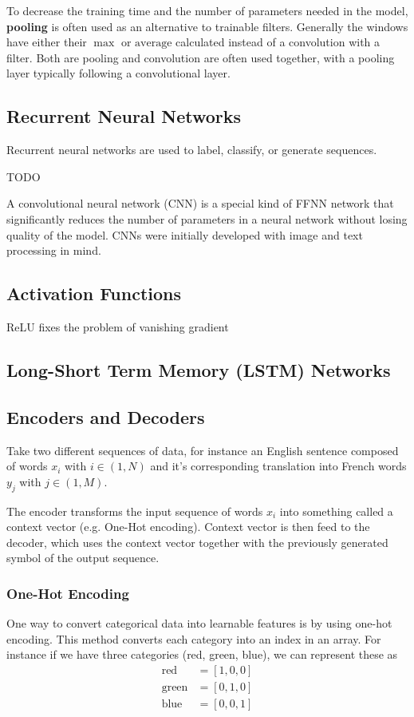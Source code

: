 To decrease the training time and the number of parameters needed in the model, \textbf{pooling} is often used as an alternative to trainable filters. Generally the windows have either their $\max$ or $\textrm{average}$ calculated instead of a convolution with a filter. Both are pooling and convolution are often used together, with a pooling layer typically following a convolutional layer.


\subsection{Recurrent Neural Networks}
Recurrent neural networks are used to label, classify, or generate sequences.

TODO



 A convolutional neural network (CNN) is a special kind of FFNN network that significantly reduces the number of parameters in a neural network without losing quality of the model. CNNs were initially developed with image and text processing in mind.


\subsection{Activation Functions}
ReLU fixes the problem of vanishing gradient




\subsection{Long-Short Term Memory (LSTM) Networks}

\subsection{Encoders and Decoders}
Take two different sequences of data, for instance an English sentence composed of words $x_i$ with $i\in (1,N)$ and it's corresponding translation into French words $y_j$ with $j\in(1,M)$.

The encoder transforms the input sequence of words $x_i$ into something called a context vector (e.g. One-Hot encoding). Context vector is then feed to the decoder, which uses the context vector together with the previously generated symbol of the output sequence. 

\subsubsection{One-Hot Encoding}
One way to convert categorical data into learnable features is by using one-hot encoding. This method converts each category into an index in an array. For instance if we have three categories (red, green, blue), we can represent these as
\begin{align}
    \textrm{red} &= [1,0,0]\\
    \textrm{green} &= [0,1,0]\\
    \textrm{blue} &= [0,0,1]
\end{align}


